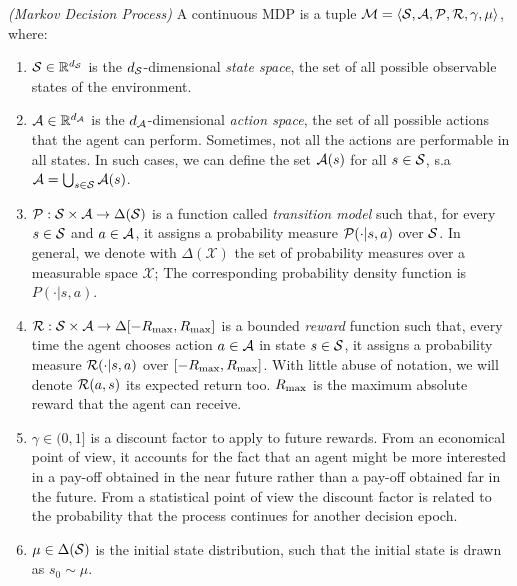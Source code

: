 \begin{definition} \emph{(Markov Decision Process)}
A continuous \gls{MDP} \cite{puterman2014markov, sutton2018reinforcement} is a tuple $\mathcal{M} = \langle\mathcal{S},\mathcal{A},\mathcal{P},\mathcal{R},\gamma,\mu\rangle$, where:

\begin{enumerate}
\item $\mathcal{S}\in\mathbb{R}^{d_{\mathcal{S}}}$ is the $d_{\mathcal{S}}$-dimensional \emph{state space}, \ie the set of all possible observable states of the environment.
\item $\mathcal{A}\in\mathbb{R}^{d_{\mathcal{A}}}$ is the $d_{\mathcal{A}}$-dimensional \emph{action space}, \ie the set of all possible actions that the agent can perform. Sometimes, not all the actions are performable in all states. In such cases, we can define the set $\mathcal{A}(s)$ for all $s \in \mathcal{S}$, s.a  $\mathcal{A} = \bigcup_{s \in \mathcal{S}} \mathcal{A}(s)$.
\item  $\mathcal{P}:\mathcal{S}\times\mathcal{A}\to\Delta(\mathcal{S})$ is a function called \emph{transition model} such that, for every $s\in\mathcal{S}$ and $a\in\mathcal{A}$, it assigns a probability measure $\mathcal{P}(\cdot|s,a)$ over $\mathcal{S}$. In general, we denote with $\Delta(\mathcal{X})$ the set of probability measures over a measurable space $\mathcal{X}$; The corresponding probability density function is $P(\cdot|s,a)$.
\item $\mathcal{R}:\mathcal{S}\times\mathcal{A}\to\Delta[-R_{\max},R_{\max}]$ is a bounded \emph{reward} function such that, every time the agent chooses action $a\in\mathcal{A}$ in state $s\in\mathcal{S}$, it assigns a probability measure $\mathcal{R}(\cdot|s,a)$ over $[-R_{\max},R_{\max}]$. With little abuse of notation, we will denote $\mathcal{R}(a, s)$ its expected return too. $R_{\max}$ is the maximum absolute reward that the agent can receive.
\item $\gamma\in(0,1]$ is a discount factor to apply to future rewards. From an economical point of view, it accounts for the fact that an agent might be more interested in a pay-off obtained in the near future rather than a pay-off obtained far in the future. From a statistical point of view the discount factor is related to the probability that the process continues for another decision epoch.
\item $\mu\in\Delta(\mathcal{S})$ is the initial state distribution, such that the initial state is drawn as $s_0\sim\mu$.
\end{enumerate}
\end{definition}

